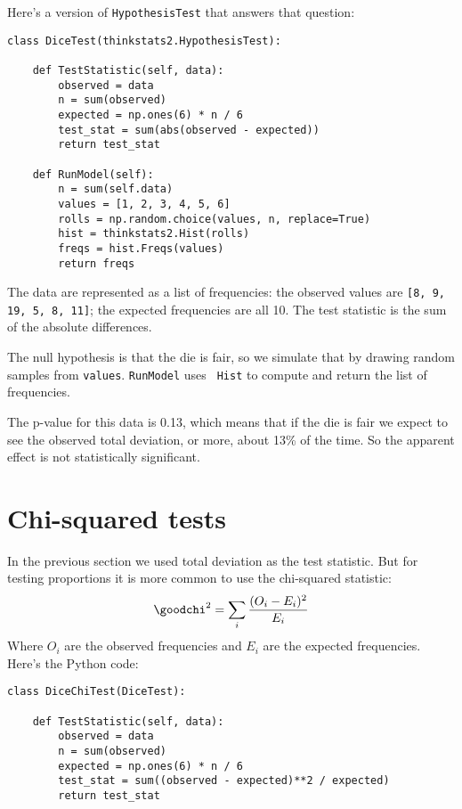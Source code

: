 \documentclass[12pt]{book}
\begin{document}
Here's a version of {\tt HypothesisTest} that answers that question:

\begin{verbatim}
class DiceTest(thinkstats2.HypothesisTest):

    def TestStatistic(self, data):
        observed = data
        n = sum(observed)
        expected = np.ones(6) * n / 6
        test_stat = sum(abs(observed - expected))
        return test_stat

    def RunModel(self):
        n = sum(self.data)
        values = [1, 2, 3, 4, 5, 6]
        rolls = np.random.choice(values, n, replace=True)
        hist = thinkstats2.Hist(rolls)
        freqs = hist.Freqs(values)
        return freqs
\end{verbatim}

The data are represented as a list of frequencies: the observed
values are {\tt [8, 9, 19, 5, 8, 11]}; the expected frequencies
are all 10.  The test statistic is the sum of the absolute differences.

The null hypothesis is that the die is fair, so we simulate that by
drawing random samples from {\tt values}.  {\tt RunModel} uses {\tt
  Hist} to compute and return the list of frequencies.

The p-value for this data is 0.13, which means that if the die is
fair we expect to see the observed total deviation, or more, about
13\% of the time.  So the apparent effect is not statistically
significant.
   


\section{Chi-squared tests}
\label{casino2}

In the previous section we used total deviation as the test statistic.
But for testing proportions it is more common to use the chi-squared
statistic:
%
\[ \goodchi^2 = \sum_i \frac{(O_i - E_i)^2}{E_i} \]
%
% 
Where $O_i$ are the observed frequencies and $E_i$ are the expected
frequencies.  Here's the Python code:

\begin{verbatim}
class DiceChiTest(DiceTest):

    def TestStatistic(self, data):
        observed = data
        n = sum(observed)
        expected = np.ones(6) * n / 6
        test_stat = sum((observed - expected)**2 / expected)
        return test_stat
\end{verbatim}
\end{document}

